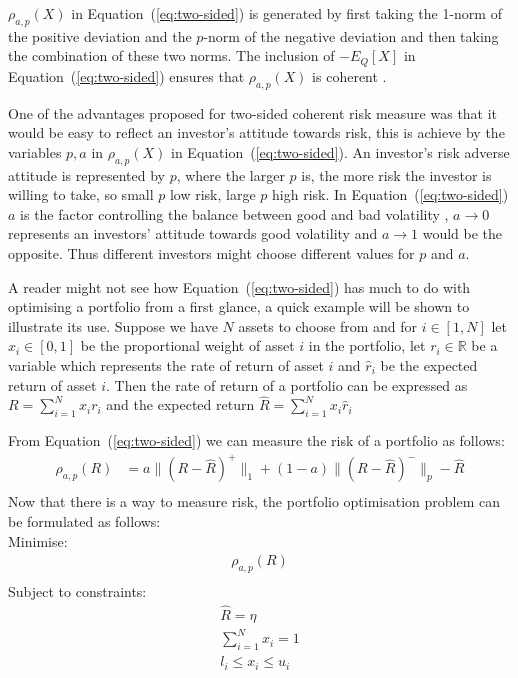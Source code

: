   $\rho_{a,p}(X)$ in Equation~(\ref{eq:two-sided}) is generated by first taking the 1-norm of the positive deviation and the $p$-norm of the negative deviation and then taking the combination of these two norms. The inclusion of $- E_Q[X]$ in Equation~(\ref{eq:two-sided}) ensures that $\rho_{a,p}(X)$ is coherent \cite{two_sided_risk}. 

  One of the advantages proposed for two-sided coherent risk measure was that it would be easy to reflect an investor's attitude towards risk, this is achieve by the variables $p,a$ in $\rho_{a,p}(X)$ in Equation~(\ref{eq:two-sided}). An investor's risk adverse attitude is represented by $p$, where the larger $p$ is, the more risk the investor is willing to take, so small $p$ low risk, large $p$ high risk. In Equation~(\ref{eq:two-sided}) $a$ is the factor controlling the balance between good and bad volatility \cite{two_sided_risk}, $a \to 0$ represents an investors' attitude towards good volatility and $a \to 1$ would be the opposite. Thus different investors might choose different values for $p$ and $a$.

  A reader might not see how Equation~(\ref{eq:two-sided}) has much to do with optimising a portfolio from a first glance, a quick example will be shown to illustrate its use. Suppose we have $N$ assets to choose from and for $i \in [1,N]$ let $x_i \in [0,1]$ be the proportional weight of asset $i$ in the portfolio, let $r_i \in \mathbb{R}$ be a variable which represents the rate of return of asset $i$ and $\widehat{r}_i$ be the expected return of asset $i$. Then the rate of return of a portfolio can be expressed as $R = \sum_{i=1}^N x_i r_i$ and the expected return $\widehat{R} = \sum_{i=1}^N  x_i \widehat{r}_i$

  From Equation~(\ref{eq:two-sided}) we can measure the risk of a portfolio as follows:
  \begin{equation} \label{eq:portfolio-risk}
    \begin{split}
      \rho_{a,p}(R) & = a \|(R-\widehat{R})^+\|_1 + (1-a)\|(R-\widehat{R})^-\|_p - \widehat{R} \\
    \end{split}
  \end{equation} 
  Now that there is a way to measure risk, the portfolio optimisation problem can be formulated as follows: \\
  Minimise:
  \begin{equation} \label{eq:portfolio-risk-min}
    \begin{split}
      \rho_{a,p}(R) \\
    \end{split}
  \end{equation} 
  Subject to constraints:
  \begin{equation} \label{eq:portfolio-risk-constraints}
    \begin{split}
      \widehat{R} = \eta \\
      \sum\limits_{i=1}^N x_i = 1 \\
      l_i \leq x_i \leq u_i
    \end{split}
  \end{equation} 

